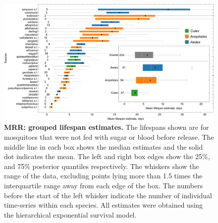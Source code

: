 \documentclass[12pt]{article}
\begin{document}
\begin{figure}[h]
	\centerline{\includegraphics[width=1\textwidth]{./Figure_files/mrr_lifetimes_final_female_without_sugar_not_blood.pdf}}
	\caption{\textbf{MRR: grouped lifespan estimates.} The lifespans shown are for mosquitoes that were not fed with sugar or blood before release. The middle line in each box shows the median estimates and the solid dot indicates the mean. The left and right box edges show the 25\%, and 75\% posterior quantiles respectively. The whiskers show the range of the data, excluding points lying more than 1.5 times the interquartile range away from each edge of the box. The numbers before the start of the left whisker indicate the number of individual time-series within each species. All estimates were obtained using the hierarchical exponential survival model.}
	\label{fig:mrr_lifespans}
\end{figure}
\end{document}
